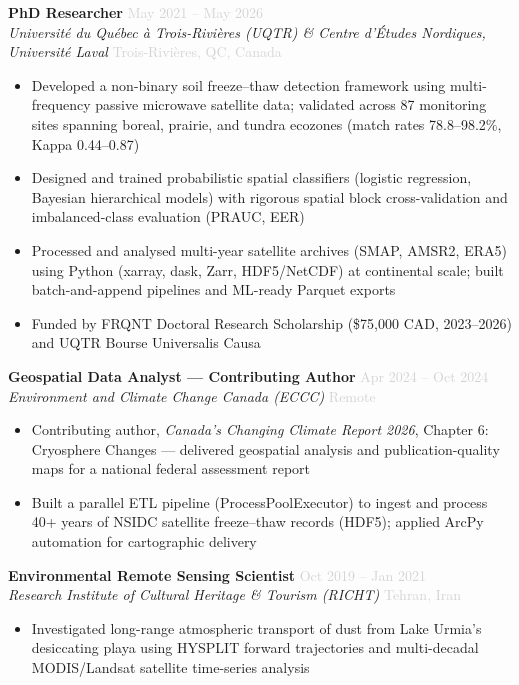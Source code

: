 \documentclass[10pt, a4paper]{article}
\newcommand{\dategray}[1]{\textcolor{lightgray}{\small #1}}
\newcommand{\jobtitle}[4]{%
  \noindent\textbf{#1} \hfill \dategray{#3} \\
  \textit{#2} \hfill \dategray{#4} \\[-4pt]
}
\begin{document}
\vspace{6pt}

\jobtitle{PhD Researcher}
         {Université du Québec à Trois-Rivières (UQTR) \& Centre d'Études Nordiques, Université Laval}
         {May 2021 -- May 2026}
         {Trois-Rivières, QC, Canada}
\begin{itemize}
  \item Developed a non-binary soil freeze–thaw detection framework using
        multi-frequency passive microwave satellite data; validated across
        87 monitoring sites spanning boreal, prairie, and tundra ecozones
        (match rates 78.8–98.2\%, Kappa 0.44–0.87)
  \item Designed and trained probabilistic spatial classifiers (logistic
        regression, Bayesian hierarchical models) with rigorous spatial
        block cross-validation and imbalanced-class evaluation (PRAUC, EER)
  \item Processed and analysed multi-year satellite archives (SMAP, AMSR2,
        ERA5) using Python (xarray, dask, Zarr, HDF5/NetCDF) at continental
        scale; built batch-and-append pipelines and ML-ready Parquet exports
  \item Funded by FRQNT Doctoral Research Scholarship (\$75,000 CAD,
        2023–2026) and UQTR Bourse Universalis Causa
\end{itemize}

\vspace{6pt}

\jobtitle{Geospatial Data Analyst --- Contributing Author}
         {Environment and Climate Change Canada (ECCC)}
         {Apr 2024 -- Oct 2024}
         {Remote}
\begin{itemize}
  \item Contributing author, \textit{Canada's Changing Climate Report 2026},
        Chapter 6: Cryosphere Changes --- delivered geospatial analysis and
        publication-quality maps for a national federal assessment report
  \item Built a parallel ETL pipeline (ProcessPoolExecutor) to ingest and
        process 40+ years of NSIDC satellite freeze–thaw records (HDF5);
        applied ArcPy automation for cartographic delivery
\end{itemize}

\vspace{6pt}

\jobtitle{Environmental Remote Sensing Scientist}
         {Research Institute of Cultural Heritage \& Tourism (RICHT)}
         {Oct 2019 -- Jan 2021}
         {Tehran, Iran}
\begin{itemize}
  \item Investigated long-range atmospheric transport of dust from Lake
        Urmia's desiccating playa using HYSPLIT forward trajectories and
        multi-decadal MODIS/Landsat satellite time-series analysis
\end{itemize}
\end{document}
